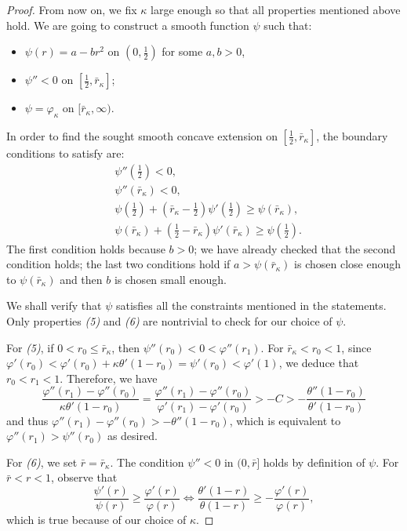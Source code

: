 \documentclass[10pt, reqno]{amsart}
\theoremstyle{plain}
\theoremstyle{remark}
\theoremstyle{definition}
\numberwithin{equation}{section}
\theoremstyle{plain}
\begin{document}
\begin{proof}
    From now on, we fix $\kappa$ large enough so that all properties mentioned above hold.
    We are going to construct a smooth function $\psi$ such that:
    \begin{itemize}
        \item $\psi(r)=a-br^2$ on $(0, \frac12)$ for some $a, b>0$,
        \item $\psi''<0$ on $[\frac12, \bar r_\kappa]$;
        \item $\psi=\varphi_\kappa$ on $[\bar r_\kappa, \infty)$.
    \end{itemize}
    In order to find the sought smooth concave extension on $[\frac12, \bar r_\kappa]$, the boundary conditions to satisfy are:
    \begin{align*}
        &\psi''(\tfrac12) < 0,\\
        &\psi''(\bar r_\kappa)<0,\\
        &\psi(\tfrac12) + (\bar r_\kappa-\tfrac12)\psi'(\tfrac12)\ge \psi(\bar r_\kappa),\\
        &\psi(\bar r_\kappa) + (\tfrac12-\bar r_\kappa)\psi'(\bar r_\kappa) \ge \psi(\tfrac12).
    \end{align*}
    The first condition holds because $b>0$; we have already checked that the second condition holds; the last two conditions hold if $a>\psi(\bar r_\kappa)$ is chosen close enough to $\psi(\bar r_\kappa)$ and then $b$ is chosen small enough.

    We shall verify that $\psi$ satisfies all the constraints mentioned in the statements. Only properties \textit{(5)} and \textit{(6)} are nontrivial to check for our choice of $\psi$.

    For \textit{(5)}, if $0<r_0\le\bar r_\kappa$, then $\psi''(r_0) < 0 < \varphi''(r_1)$. 
    For $\bar r_\kappa<r_0<1$, since $\varphi'(r_0) < \varphi'(r_0) + \kappa\theta'(1-r_0) = \psi'(r_0)<\varphi'(1)$, we deduce that $r_0<r_1<1$.
    Therefore, we have
    \begin{equation*}
        \frac{\varphi''(r_1)-\varphi''(r_0)}{\kappa\theta'(1-r_0)}
        =
        \frac{\varphi''(r_1)-\varphi''(r_0)}{\varphi'(r_1)-\varphi'(r_0)}
        > - C
        >
        -\frac{\theta''(1-r_0)}{\theta'(1-r_0)}
    \end{equation*}
    and thus $\varphi''(r_1)-\varphi''(r_0)>-\theta''(1-r_0)$, which is equivalent to $\varphi''(r_1)>\psi''(r_0)$ as desired.

    For \textit{(6)}, we set $\bar r=\bar r_\kappa$. The condition $\psi''<0$ in $(0, \bar r]$ holds by definition of $\psi$. For $\bar r<r<1$, observe that
    \begin{equation*}
        \frac{\psi'(r)}{\psi(r)} \ge \frac{\varphi'(r)}{\varphi(r)} \iff
        \frac{\theta'(1-r)}{\theta(1-r)}
        \ge
        -\frac{\varphi'(r)}{\varphi(r)},
    \end{equation*}
    which is true because of our choice of $\kappa$.
\end{proof}
\end{document}
